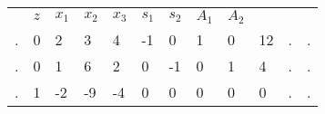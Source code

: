 \documentclass[answers]{exam}
\begin{document}
\begin{tabular}{llllllllllll}
	& $z$                    & $x_1$ & $x_2$ & $x_3$ & $s_1$ & $s_2$ & $A_1$ & $A_2$                  &                         &   &   \\ \cline{2-10}
	\multicolumn{1}{l|}{.} & \multicolumn{1}{l|}{0} & 2     & 3     & 4     & -1    & 0     & 1     & \multicolumn{1}{l|}{0} & \multicolumn{1}{l|}{12} & . & . \\
	\multicolumn{1}{l|}{.} & \multicolumn{1}{l|}{0} & 1     & 6     & 2     & 0     & -1    & 0     & \multicolumn{1}{l|}{1} & \multicolumn{1}{l|}{4}  & . & . \\ \cline{2-10}
	\multicolumn{1}{l|}{.} & \multicolumn{1}{l|}{1} & -2   & -9   & -4    & 0     & 0     & 0     & \multicolumn{1}{l|}{0} & \multicolumn{1}{l|}{0}  & . & . \\ \cline{2-10}
\end{tabular}
\end{document}
